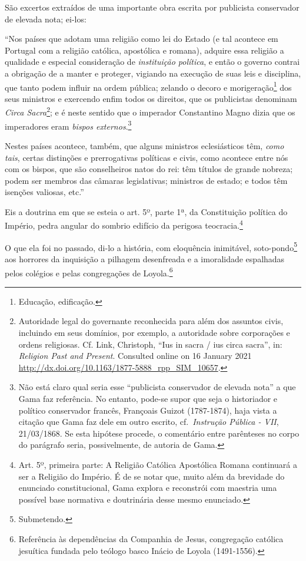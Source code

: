 São excertos extraídos de uma importante obra escrita por publicista
conservador de elevada nota; ei-los:

``Nos países que adotam uma religião como lei do Estado (e tal acontece
em Portugal com a religião católica, apostólica e romana), adquire essa
religião a qualidade e especial consideração de \emph{instituição
política}, e então o governo contrai a obrigação de a manter e proteger,
vigiando na execução de suas leis e disciplina, que tanto podem influir
na ordem pública; zelando o decoro e morigeração\footnote{Educação,
  edificação.} dos seus ministros e exercendo enfim todos os direitos,
que os publicistas denominam \emph{Circa Sacra}\footnote{Autoridade
  legal do governante reconhecida para além dos assuntos civis,
  incluindo em seus domínios, por exemplo, a autoridade sobre
  corporações e ordens religiosas. Cf. Link, Christoph, ``Ius in sacra /
  ius circa sacra'', in: \emph{Religion Past and Present}. Consulted
  online on 16 January 2021
  \url{http://dx.doi.org/10.1163/1877-5888_rpp_SIM_10657}.}; e é neste
sentido que o imperador Constantino Magno dizia que os imperadores eram
\emph{bispos externos}.\footnote{Não está claro qual seria esse
  ``publicista conservador de elevada nota'' a que Gama faz referência. No
  entanto, pode-se supor que seja o historiador e político conservador
  francês, Françoais Guizot (1787-1874), haja vista a citação que Gama
  faz dele em outro escrito, cf.~\emph{Instrução Pública - VII},
  21/03/1868. Se esta hipótese procede, o comentário entre parênteses no
  corpo do parágrafo seria, possivelmente, de autoria de Gama.}

Nestes países acontece, também, que alguns ministros eclesiásticos têm,
\emph{como tais}, certas distinções e prerrogativas políticas e civis,
como acontece entre nós com os bispos, que são conselheiros natos do
rei: têm títulos de grande nobreza; podem ser membros das câmaras
legislativas; ministros de estado; e todos têm isenções valiosas, etc.''

Eis a doutrina em que se esteia o art. 5º, parte 1ª, da Constituição
política do Império, pedra angular do sombrio edifício da perigosa
teocracia.\footnote{Art. 5º, primeira parte: A Religião Católica
  Apostólica Romana continuará a ser a Religião do Império. É de se
  notar que, muito além da brevidade do enunciado constitucional, Gama
  explora e reconstrói com maestria uma possível base normativa e
  doutrinária desse mesmo enunciado.}

O que ela foi no passado, di-lo a história, com eloquência inimitável,
soto-pondo\footnote{Submetendo.} aos horrores da inquisição a pilhagem
desenfreada e a imoralidade espalhadas pelos colégios e pelas
congregações de Loyola.\footnote{Referência às dependências da
  Companhia de Jesus, congregação católica jesuítica fundada pelo
  teólogo basco Inácio de Loyola (1491-1556).}

